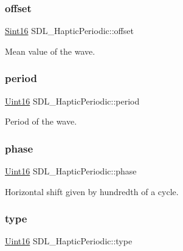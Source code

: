 \subsubsection{\texorpdfstring{offset}{offset}}
{\footnotesize\ttfamily \hyperlink{_s_d_l__stdinc_8h_a9d0257032c0e146ab6121bf0122712f5}{Sint16} S\+D\+L\+\_\+\+Haptic\+Periodic\+::offset}

Mean value of the wave. \mbox{\label{struct_s_d_l___haptic_periodic_a0e7e105b96308129b248d52b56a2a839}} 
\subsubsection{\texorpdfstring{period}{period}}
{\footnotesize\ttfamily \hyperlink{_s_d_l__stdinc_8h_a31fcc0a076c9068668173ee26d33e42b}{Uint16} S\+D\+L\+\_\+\+Haptic\+Periodic\+::period}

Period of the wave. \mbox{\label{struct_s_d_l___haptic_periodic_a25e8c6aebc78bd74b9343fa228d25d8f}} 
\subsubsection{\texorpdfstring{phase}{phase}}
{\footnotesize\ttfamily \hyperlink{_s_d_l__stdinc_8h_a31fcc0a076c9068668173ee26d33e42b}{Uint16} S\+D\+L\+\_\+\+Haptic\+Periodic\+::phase}

Horizontal shift given by hundredth of a cycle. \mbox{\label{struct_s_d_l___haptic_periodic_ac53c5725e8cff012e9b90e01b7110869}} 
\subsubsection{\texorpdfstring{type}{type}}
{\footnotesize\ttfamily \hyperlink{_s_d_l__stdinc_8h_a31fcc0a076c9068668173ee26d33e42b}{Uint16} S\+D\+L\+\_\+\+Haptic\+Periodic\+::type}

